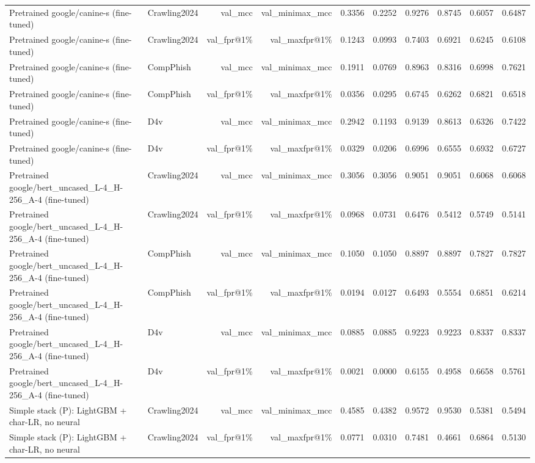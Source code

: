 \begin{table}[t]
\begin{tabular}{llrrrrrrrr}
Pretrained google/canine-s (fine-tuned) & Crawling2024 & val\_mcc & val\_minimax\_mcc & 0.3356 & 0.2252 & 0.9276 & 0.8745 & 0.6057 & 0.6487 \\
Pretrained google/canine-s (fine-tuned) & Crawling2024 & val\_fpr@1\% & val\_maxfpr@1\% & 0.1243 & 0.0993 & 0.7403 & 0.6921 & 0.6245 & 0.6108 \\
Pretrained google/canine-s (fine-tuned) & CompPhish & val\_mcc & val\_minimax\_mcc & 0.1911 & 0.0769 & 0.8963 & 0.8316 & 0.6998 & 0.7621 \\
Pretrained google/canine-s (fine-tuned) & CompPhish & val\_fpr@1\% & val\_maxfpr@1\% & 0.0356 & 0.0295 & 0.6745 & 0.6262 & 0.6821 & 0.6518 \\
Pretrained google/canine-s (fine-tuned) & D4v & val\_mcc & val\_minimax\_mcc & 0.2942 & 0.1193 & 0.9139 & 0.8613 & 0.6326 & 0.7422 \\
Pretrained google/canine-s (fine-tuned) & D4v & val\_fpr@1\% & val\_maxfpr@1\% & 0.0329 & 0.0206 & 0.6996 & 0.6555 & 0.6932 & 0.6727 \\
Pretrained google/bert\_uncased\_L-4\_H-256\_A-4 (fine-tuned) & Crawling2024 & val\_mcc & val\_minimax\_mcc & 0.3056 & 0.3056 & 0.9051 & 0.9051 & 0.6068 & 0.6068 \\
Pretrained google/bert\_uncased\_L-4\_H-256\_A-4 (fine-tuned) & Crawling2024 & val\_fpr@1\% & val\_maxfpr@1\% & 0.0968 & 0.0731 & 0.6476 & 0.5412 & 0.5749 & 0.5141 \\
Pretrained google/bert\_uncased\_L-4\_H-256\_A-4 (fine-tuned) & CompPhish & val\_mcc & val\_minimax\_mcc & 0.1050 & 0.1050 & 0.8897 & 0.8897 & 0.7827 & 0.7827 \\
Pretrained google/bert\_uncased\_L-4\_H-256\_A-4 (fine-tuned) & CompPhish & val\_fpr@1\% & val\_maxfpr@1\% & 0.0194 & 0.0127 & 0.6493 & 0.5554 & 0.6851 & 0.6214 \\
Pretrained google/bert\_uncased\_L-4\_H-256\_A-4 (fine-tuned) & D4v & val\_mcc & val\_minimax\_mcc & 0.0885 & 0.0885 & 0.9223 & 0.9223 & 0.8337 & 0.8337 \\
Pretrained google/bert\_uncased\_L-4\_H-256\_A-4 (fine-tuned) & D4v & val\_fpr@1\% & val\_maxfpr@1\% & 0.0021 & 0.0000 & 0.6155 & 0.4958 & 0.6658 & 0.5761 \\
Simple stack (P): LightGBM + char-LR, no neural & Crawling2024 & val\_mcc & val\_minimax\_mcc & 0.4585 & 0.4382 & 0.9572 & 0.9530 & 0.5381 & 0.5494 \\
Simple stack (P): LightGBM + char-LR, no neural & Crawling2024 & val\_fpr@1\% & val\_maxfpr@1\% & 0.0771 & 0.0310 & 0.7481 & 0.4661 & 0.6864 & 0.5130 \\

\end{tabular}
\end{table}
